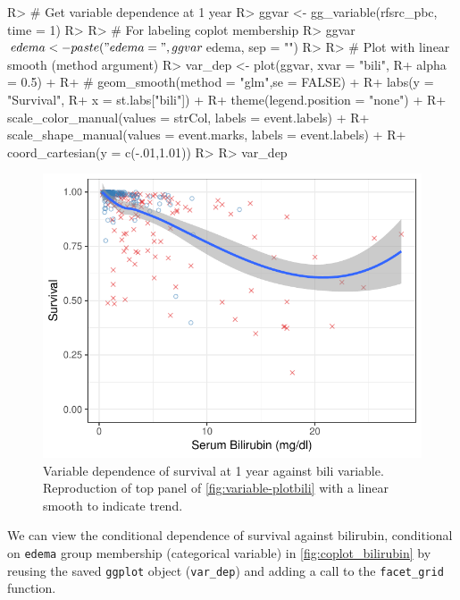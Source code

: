 \documentclass[article]{jss}
\begin{document}
\begin{Schunk}
\begin{Sinput}
R> # Get variable dependence at 1 year
R> ggvar <- gg_variable(rfsrc_pbc, time = 1)
R> 
R> # For labeling coplot membership
R> ggvar$edema <- paste("edema = ", ggvar$edema, sep = "")
R> 
R> # Plot with linear smooth (method argument)
R> var_dep <- plot(ggvar, xvar = "bili",
R+                 alpha = 0.5) +
R+ #  geom_smooth(method = "glm",se = FALSE) +
R+   labs(y = "Survival",
R+        x = st.labs["bili"]) +
R+   theme(legend.position = "none") +
R+   scale_color_manual(values = strCol, labels = event.labels) +
R+   scale_shape_manual(values = event.marks, labels = event.labels) +
R+   coord_cartesian(y = c(-.01,1.01))
R> 
R> var_dep
\end{Sinput}
\begin{figure}[!htb]

{\centering \includegraphics{rfs-var_dep-1} 

}

\caption{Variable dependence of survival at 1 year against bili variable. Reproduction of top panel of \autoref{fig:variable-plotbili} with a linear smooth to indicate trend.}\label{fig:var_dep}
\end{figure}
\end{Schunk}

We can view the conditional dependence of survival against bilirubin,
conditional on \texttt{edema} group membership (categorical variable) in
\autoref{fig:coplot_bilirubin} by reusing the saved \texttt{ggplot}
object (\texttt{var\_dep}) and adding a call to the \texttt{facet\_grid}
function.
\end{document}

